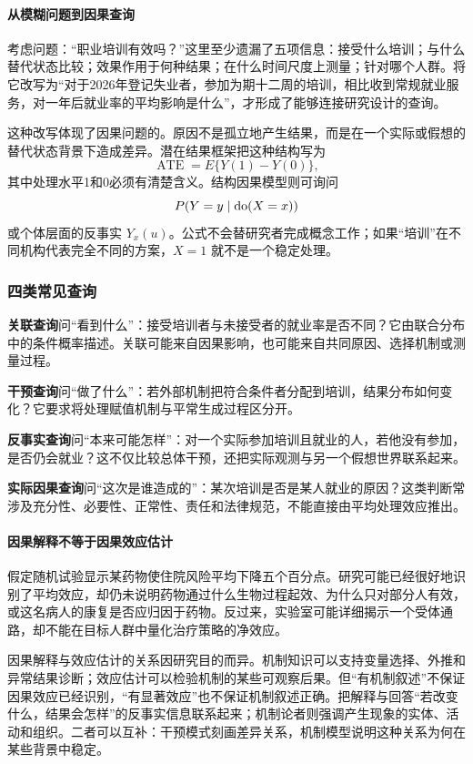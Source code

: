 \paragraph{从模糊问题到因果查询}

考虑问题：“职业培训有效吗？”这里至少遗漏了五项信息：接受什么培训；与什么替代状态比较；效果作用于何种结果；在什么时间尺度上测量；针对哪个人群。将它改写为“对于2026年登记失业者，参加为期十二周的培训，相比收到常规就业服务，对一年后就业率的平均影响是什么”，才形成了能够连接研究设计的查询。

这种改写体现了因果问题的。原因不是孤立地产生结果，而是在一个实际或假想的替代状态背景下造成差异。潜在结果框架把这种结构写为
\[
\operatorname{ATE}=E\{Y(1)-Y(0)\},
\]
其中处理水平1和0必须有清楚含义。结构因果模型则可询问
\[
P(Y=y\mid \operatorname{do}(X=x))
\]
或个体层面的反事实 $Y_x(u)$。公式不会替研究者完成概念工作；如果“培训”在不同机构代表完全不同的方案，$X=1$ 就不是一个稳定处理。

\subsubsection{四类常见查询}

\textbf{关联查询}问“看到什么”：接受培训者与未接受者的就业率是否不同？它由联合分布中的条件概率描述。关联可能来自因果影响，也可能来自共同原因、选择机制或测量过程。

\textbf{干预查询}问“做了什么”：若外部机制把符合条件者分配到培训，结果分布如何变化？它要求将处理赋值机制与平常生成过程区分开。

\textbf{反事实查询}问“本来可能怎样”：对一个实际参加培训且就业的人，若他没有参加，是否仍会就业？这不仅比较总体干预，还把实际观测与另一个假想世界联系起来。

\textbf{实际因果查询}问“这次是谁造成的”：某次培训是否是某人就业的原因？这类判断常涉及充分性、必要性、正常性、责任和法律规范，不能直接由平均处理效应推出。

\paragraph{因果解释不等于因果效应估计}

假定随机试验显示某药物使住院风险平均下降五个百分点。研究可能已经很好地识别了平均效应，却仍未说明药物通过什么生物过程起效、为什么只对部分人有效，或这名病人的康复是否应归因于药物。反过来，实验室可能详细揭示一个受体通路，却不能在目标人群中量化治疗策略的净效应。

因果解释与效应估计的关系因研究目的而异。机制知识可以支持变量选择、外推和异常结果诊断；效应估计可以检验机制的某些可观察后果。但“有机制叙述”不保证因果效应已经识别，“有显著效应”也不保证机制叙述正确。\textcite{woodward2003}把解释与回答“若改变什么，结果会怎样”的反事实信息联系起来；机制论者则强调产生现象的实体、活动和组织。二者可以互补：干预模式刻画差异关系，机制模型说明这种关系为何在某些背景中稳定。

